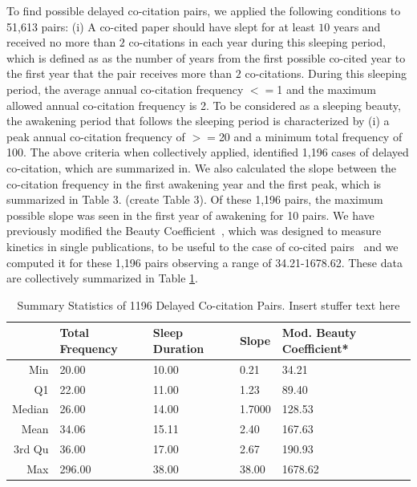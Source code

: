 \documentclass[utf8]{frontiersSCNS}
\begin{document}
To find possible delayed co-citation pairs, we applied the following conditions to 51,613 pairs: (i)  A co-cited paper should have slept for at least $10$ years and received no more than $2$ co-citations in each year during this sleeping period, which is defined as as the number of years from the first possible co-cited year to the first year that the pair receives more than $2$ co-citations. During this sleeping period, the average annual co-citation frequency $<=$1 and the maximum allowed annual co-citation frequency is 2. To be considered as a sleeping beauty, the awakening period that follows the sleeping period is characterized by (i) a peak annual co-citation frequency of $>=$20 and a minimum total frequency of 100. The above criteria when collectively applied, identified 1,196 cases of delayed co-citation, which are summarized in. We also calculated the slope between the co-citation frequency in the first awakening year and the first peak, which is summarized in Table 3. (create Table 3). Of these 1,196 pairs, the maximum possible slope was seen in the first year of awakening for 10 pairs.  We have previously modified the Beauty Coefficient~\citep{Ke2015}, which was designed to measure kinetics in single publications, to be useful to the case of co-cited pairs~\citep{devarakonda_2020} and we computed it for these 1,196 pairs observing a range of 34.21-1678.62. These data are collectively summarized in Table \ref{tab:table2}.  

\begin{table}[ht]
\caption{Summary Statistics of 1196 Delayed Co-citation Pairs. Insert stuffer text here}%
\centering %
\begin{center}
\begin{tabular}{rllll} 
& Total Frequency & Sleep Duration & Slope & Mod. Beauty Coefficient* \\
\hline %
Min &  20.00 & 10.00 & 0.21 & 34.21   \\ 
Q1  &  22.00 & 11.00  & 1.23 & 89.40   \\ 
Median & 26.00 & 14.00 & 1.7000 & 128.53   \\ 
Mean & 34.06 & 15.11 & 2.40 & 167.63   \\ 
3rd Qu & 36.00 & 17.00 & 2.67 & 190.93   \\ 
Max & 296.00 & 38.00  & 38.00  & 1678.62   \\ 
\hline
\end{tabular}
\end{center}
\label{tab:table2} %
\end{table}
\end{document}
